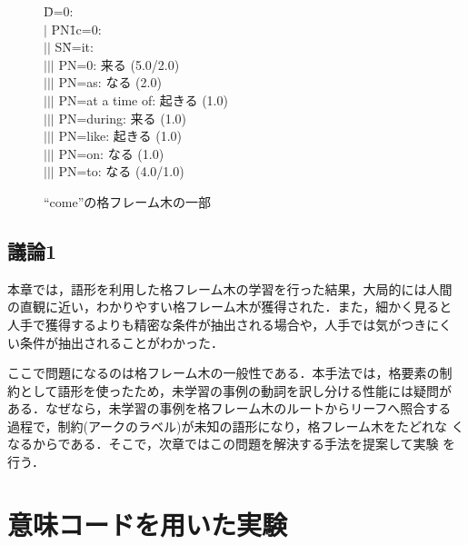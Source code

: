 \begin{figure}
  \begin{center}
    \begin{minipage}{80mm}
      \large
      \def\baselinestretch{}
      \normalsize
      \begin{tabbing}
        D\=\bras{}=0:\\
        $|$\> PN\=1\bras{}c=0:\\
        $|$\>\>$|$ SN\=\bras{}=it:\\
        $|$\>\>$|$\>$|$ PN\bras{}=0: 来る (5.0/2.0)\\ 
        $|$\>\>$|$\>$|$ PN\bras{}=as: なる (2.0)\\ 
        $|$\>\>$|$\>$|$ PN\bras{}=at a time of: 起きる (1.0)\\ 
        $|$\>\>$|$\>$|$ PN\bras{}=during: 来る (1.0)\\ 
        $|$\>\>$|$\>$|$ PN\bras{}=like: 起きる (1.0)\\ 
        $|$\>\>$|$\>$|$ PN\bras{}=on: なる (1.0)\\ 
        $|$\>\>$|$\>$|$ PN\bras{}=to: なる (4.0/1.0)
      \end{tabbing}
    \end{minipage}
  \end{center}
\caption{``come''の格フレーム木の一部}
\end{figure}

\subsection{議論1}

本章では，語形を利用した格フレーム木の学習を行った結果，大局的には人間
の直観に近い，わかりやすい格フレーム木が獲得された．また，細かく見ると
人手で獲得するよりも精密な条件が抽出される場合や，人手では気がつきにく
い条件が抽出されることがわかった．

ここで問題になるのは格フレーム木の一般性である．本手法では，格要素の制
約として語形を使ったため，未学習の事例の動詞を訳し分ける性能には疑問が
ある．なぜなら，未学習の事例を格フレーム木のルートからリーフへ照合する
過程で，制約(アークのラベル)が未知の語形になり，格フレーム木をたどれな
くなるからである．そこで，次章ではこの問題を解決する手法を提案して実験
を行う\cite{Tan94b}．

\section{意味コードを用いた実験}


